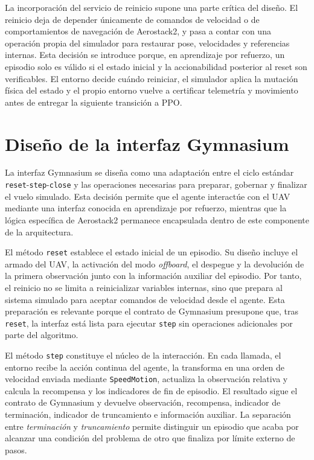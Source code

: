 La incorporación del servicio de reinicio supone una parte crítica del
diseño. El reinicio deja de depender únicamente de comandos de velocidad o de
comportamientos de navegación de Aerostack2, y pasa a contar con una operación
propia del simulador para restaurar pose, velocidades y referencias internas. 
Esta decisión se introduce porque, en aprendizaje
por refuerzo, un episodio solo es válido si el estado inicial y la accionabilidad
posterior al reset son verificables. El entorno decide cuándo reiniciar, el
simulador aplica la mutación física del estado y el propio entorno vuelve a
certificar telemetría y movimiento antes de entregar la siguiente transición a
PPO.

\section{Diseño de la interfaz Gymnasium} \label{sct:diseno:gymnasium}

La interfaz Gymnasium se diseña como una adaptación entre el ciclo estándar
\texttt{reset}-\texttt{step}-\texttt{close} y las operaciones necesarias para
preparar, gobernar y finalizar el vuelo simulado. Esta decisión permite que el
agente interactúe con el UAV mediante una interfaz conocida en aprendizaje por
refuerzo, mientras que la lógica específica de Aerostack2 permanece encapsulada
dentro de este componente de la arquitectura.

El método \texttt{reset} establece el estado inicial de un episodio. Su diseño
incluye el armado del UAV, la activación del modo \emph{offboard}, el despegue y
la devolución de la primera observación junto con la información auxiliar del
episodio. Por tanto, el reinicio no se limita a reinicializar variables internas,
sino que prepara al sistema simulado para aceptar comandos de velocidad desde el
agente. Esta preparación es relevante porque el contrato de Gymnasium presupone
que, tras \texttt{reset}, la interfaz está lista para ejecutar \texttt{step} sin
operaciones adicionales por parte del algoritmo.

El método \texttt{step} constituye el núcleo de la interacción. En cada llamada,
el entorno recibe la acción continua del agente, la transforma en una orden de
velocidad enviada mediante \texttt{SpeedMotion}, actualiza la observación relativa
y calcula la recompensa y los indicadores de fin de episodio. El resultado sigue el contrato de Gymnasium y devuelve observación, recompensa,
indicador de terminación, indicador de truncamiento e información auxiliar. La
separación entre \emph{terminación} y \emph{truncamiento} permite distinguir un episodio que acaba
por alcanzar una condición del problema de otro que finaliza por límite externo de
pasos.

